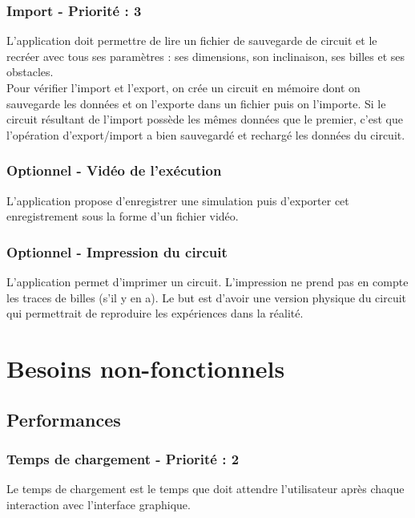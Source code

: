 \documentclass{report}
\begin{document}
\subsubsection{Import - Priorité : 3}

L’application doit permettre de lire un fichier de sauvegarde de circuit et le recréer avec tous ses paramètres : ses dimensions, son inclinaison, ses billes et ses obstacles. \\

Pour vérifier l’import et l’export, on crée un circuit en mémoire dont on sauvegarde les données et on l’exporte dans un fichier puis on l’importe. Si le circuit résultant de l’import possède les mêmes données que le premier, c’est que l’opération d’export/import a bien sauvegardé et rechargé les données du circuit.

\subsubsection{Optionnel - Vidéo de l'exécution}

L’application propose d’enregistrer une simulation puis d’exporter cet enregistrement sous la forme d’un fichier vidéo.

\subsubsection{Optionnel - Impression du circuit}

L’application permet d’imprimer un circuit. L’impression ne prend pas en compte les traces de billes (s’il y en a). Le but est d’avoir une version physique du circuit qui permettrait de reproduire les expériences dans la réalité.

\newpage

\section{Besoins non-fonctionnels}

\subsection{Performances}

\subsubsection{Temps de chargement - Priorité : 2}

Le temps de chargement est le temps que doit attendre l’utilisateur après chaque interaction avec l’interface graphique.
\end{document}
